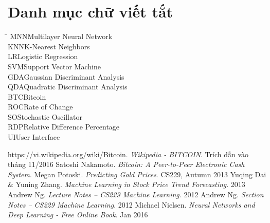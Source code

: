 \documentclass[12pt,a4paper]{report}
\begin{document}
 



\tableofcontents
\pagebreak
\listoffigures
\pagebreak 
\listoftables  
\pagebreak

\chapter*{Danh mục chữ viết tắt}
\thispagestyle{plain} 
\begin{tabbing}
\hspace{3cm}\= \kill
MNN\>Multilayer Neural Network\\
KNN\>K-Nearest Neighbors\\
LR\>Logistic Regression\\
SVM\>Support Vector Machine\\
GDA\>Gaussian Discriminant Analysis\\
QDA\>Quadratic Discriminant Analysis\\
BTC\>Bitcoin\\
ROC\>Rate of Change\\
SO\>Stochastic Oscillator\\
RDP\>Relative Difference Percentage\\
UI\>User Interface\\

\end{tabbing}

\pagebreak 


 



 
\pagebreak
\begin{thebibliography}{9}

https://vi.wikipedia.org/wiki/Bitcoin. \emph{Wikipedia - BITCOIN}. Trích dẫn vào
tháng 11/2016
Satoshi Nakamoto. \emph{Bitcoin: A Peer-to-Peer Electronic Cash System}.
Megan Potoski. \emph{Predicting Gold Prices}. CS229, Autumn 2013
Yuqing Dai \& Yuning Zhang. \emph{Machine Learning in Stock Price Trend Forecasting}. 2013 
Andrew Ng. \emph{Lecture Notes – CS229 Machine Learning}. 2012
Andrew Ng. \emph{Section Notes – CS229 Machine Learning}. 2012
Michael Nielsen. \emph{Neural Networks and Deep Learning - Free Online Book}. Jan 2016
\end{thebibliography}
\end{document}
